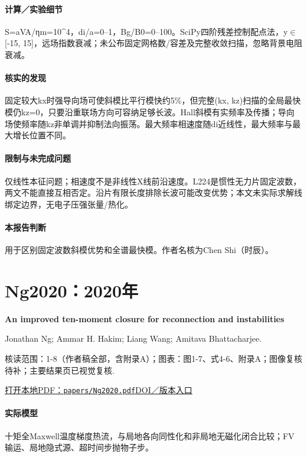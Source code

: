 \paragraph{计算／实验细节}S=aVA/ηm=10\textasciicircum{}4，di/a=0–1，Bg/B0=0–100。SciPy四阶残差控制配点法，y\ensuremath{\in}[-15, 15]，远场指数衰减；未公布固定网格数/容差及完整收敛扫描，忽略背景电阻衰减。

\paragraph{核实的发现}固定较大kx时强导向场可使斜模比平行模快约5\%，但完整(kx, kz)扫描的全局最快模仍kz=0，只要沿重联场方向可容纳足够长波。Hall斜模有实频率及传播；导向场使频率随kz非单调并抑制法向振荡。最大频率相速度随di近线性，最大频率与最大增长位置不同。

\paragraph{限制与未完成问题}仅线性本征问题；相速度不是非线性X线前沿速度。L224是惯性无力片固定波数，两文不能直接互相否定。沿片有限长度排除长波可能改变优势；本文未实际求解线绑定边界，无电子压强张量/热化。

\paragraph{本报告判断}用于区别固定波数斜模优势和全谱最快模。作者名核为Chen Shi（时辰）。

\section{Ng2020：2020年}\label{paper:Ng2020}

\textbf{An improved ten-moment closure for reconnection and instabilities}\citep{Ng2020}\

Jonathan Ng;  Ammar H. Hakim;  Liang Wang;  Amitava Bhattacharjee.

\textsf{核读范围：}1-8（作者稿全部，含附录A）；\textsf{图表：}图1-7、式4-6、附录A；图像复核待补；主要结果页已视觉复核.

\href{run:papers/Ng2020.pdf}{打开本地PDF：\texttt{papers/Ng2020.pdf}}\quad\href{https://doi.org/10.1063/5.0012067}{DOI／版本入口}

\paragraph{实际模型}十矩全Maxwell温度梯度热流，与局地各向同性化和非局地无磁化闭合比较；FV输运、局地隐式源、超时间步抛物子步。

